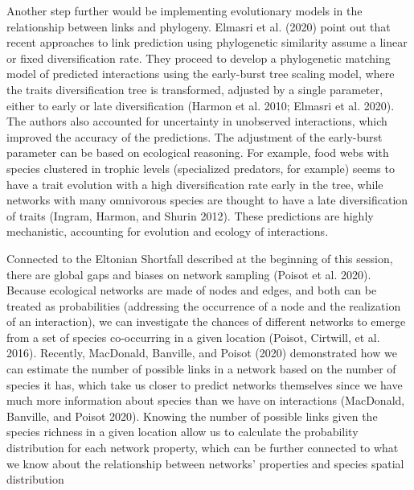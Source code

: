 \documentclass[12pt]{article}
\begin{document}
Another step further would be implementing evolutionary models in the
relationship between links and phylogeny. Elmasri et al. (2020) point
out that recent approaches to link prediction using phylogenetic
similarity assume a linear or fixed diversification rate. They proceed
to develop a phylogenetic matching model of predicted interactions using
the early-burst tree scaling model, where the traits diversification
tree is transformed, adjusted by a single parameter, either to early or
late diversification (Harmon et al. 2010; Elmasri et al. 2020). The
authors also accounted for uncertainty in unobserved interactions, which
improved the accuracy of the predictions. The adjustment of the
early-burst parameter can be based on ecological reasoning. For example,
food webs with species clustered in trophic levels (specialized
predators, for example) seems to have a trait evolution with a high
diversification rate early in the tree, while networks with many
omnivorous species are thought to have a late diversification of traits
(Ingram, Harmon, and Shurin 2012). These predictions are highly
mechanistic, accounting for evolution and ecology of interactions.

Connected to the Eltonian Shortfall described at the beginning of this
session, there are global gaps and biases on network sampling (Poisot et
al. 2020). Because ecological networks are made of nodes and edges, and
both can be treated as probabilities (addressing the occurrence of a
node and the realization of an interaction), we can investigate the
chances of different networks to emerge from a set of species
co-occurring in a given location (Poisot, Cirtwill, et al. 2016).
Recently, MacDonald, Banville, and Poisot (2020) demonstrated how we can
estimate the number of possible links in a network based on the number
of species it has, which take us closer to predict networks themselves
since we have much more information about species than we have on
interactions (MacDonald, Banville, and Poisot 2020). Knowing the number
of possible links given the species richness in a given location allow
us to calculate the probability distribution for each network property,
which can be further connected to what we know about the relationship
between networks' properties and species spatial distribution
\end{document}
